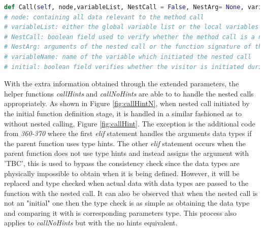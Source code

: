 \documentclass{l4proj}
\begin{document}
\begin{lstlisting}[language=Python, caption= Function signature of the \textbf{Call} visitor,  label = {lst:call}]
def Call(self, node,variableList, NestCall = False, NestArg= None, variableName = None, initial = False):
# node: containing all data relevant to the method call
# variableList: either the global variable list or the local variables of the function that contains a nested call
# NestCall: boolean field used to verify whether the method call is a nested one or not
# NestArg: arguments of the nested call or the function signature of the current function that contains the nested call
# variableName: name of the variable which initiated the nested call
# initial: boolean field verifies whether the visitor is initiated during a function definition or due to an assignment method call outwith the definition
\end{lstlisting}

\clearpage
With the extra information obtained through the extended parameters, the helper functions \textit{callHints} and \textit{callNoHints} are able to to handle the nested calls appropriately. As shown in Figure \ref{fig:callHintN}, when nested call initiated by the initial function definition stage, it is handled in a similar fashioned as to without nested calling, Figure \ref{fig:callHint}. The exception is the additional code from \textit{360-370} where the first \textit{elif} statement handles the arguments data types if the parent function uses type hints. The other \textit{elif} statement occurs when the parent function does not use type hints and instead assigns the argument with 'TBC', this is used to bypass the consistency check since the data types are physically impossible to obtain when it is being defined. However, it will be replaced and type checked when actual data with data types are passed to the function with the nested call. It can also be observed that when the nested call is not an "initial" one then the type check is as simple as obtaining the data type and comparing it with is corresponding parameters type. This process also applies to \textit{callNoHints} but with the no hints equivalent.
\end{document}
